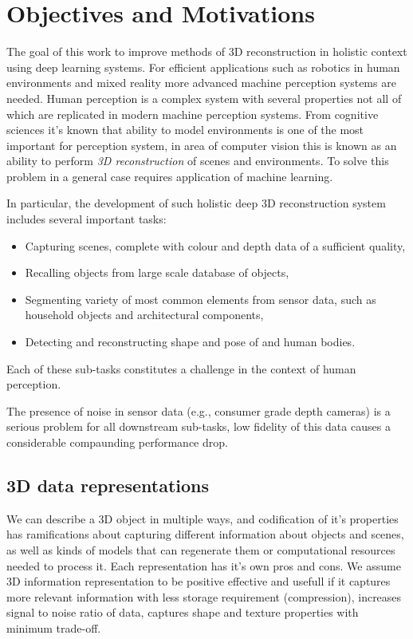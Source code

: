 \section{Objectives and Motivations}

The goal of this work to improve methods of 3D reconstruction in holistic context using deep learning systems. For efficient applications such as robotics in human environments and mixed reality more advanced machine perception systems are needed. Human perception is a complex system with several properties not all of which are replicated in modern machine perception systems. From cognitive sciences it's known that ability to model environments is one of the most important for perception system, in area of computer vision this is known as an ability to perform \textit{3D reconstruction} of scenes and environments. To solve this problem in a general case requires application of machine learning.

In particular, the development of such holistic deep 3D reconstruction system includes several important tasks:

\begin{itemize}
	\item Capturing scenes, complete with colour and depth data of a sufficient quality,
    \item Recalling objects from large scale database of objects,
    \item Segmenting variety of most common elements from sensor data, such as household objects and architectural components,
    \item Detecting and reconstructing shape and pose of and human bodies.
\end{itemize}

Each of these sub-tasks constitutes a challenge in the context of human perception.

The presence of noise in sensor data (e.g., consumer grade depth cameras) is a serious problem for all downstream sub-tasks, low fidelity of this data causes a considerable compaunding performance drop.

\subsection{3D data representations}

We can describe a 3D object in multiple ways, and codification of it's properties has ramifications about capturing different information about objects and scenes, as well as kinds of models that can regenerate them or computational resources needed to process it.
Each representation has it's own pros and cons. We assume 3D information representation to be positive effective and usefull if it captures more relevant information with less storage requirement (compression), increases signal to noise ratio of data, captures shape and texture properties with minimum trade-off.


